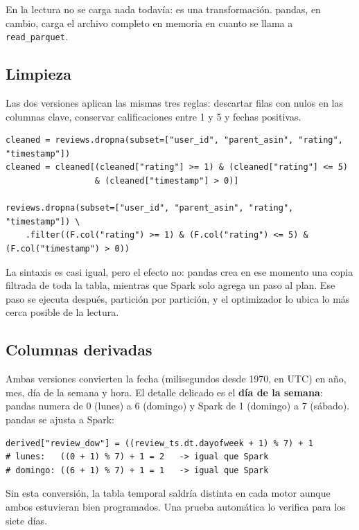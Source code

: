 \documentclass[11pt,a4paper]{article}
\begin{document}
En la lectura no se carga nada todavía: es una transformación. pandas, en cambio, carga el
archivo completo en memoria en cuanto se llama a \texttt{read\_parquet}.

\subsection{Limpieza}

Las dos versiones aplican las mismas tres reglas: descartar filas con nulos en las columnas
clave, conservar calificaciones entre 1 y 5 y fechas positivas.

\begin{lstlisting}[caption={Limpieza en pandas (arriba) y en Spark (abajo).}]
cleaned = reviews.dropna(subset=["user_id", "parent_asin", "rating", "timestamp"])
cleaned = cleaned[(cleaned["rating"] >= 1) & (cleaned["rating"] <= 5)
                  & (cleaned["timestamp"] > 0)]

reviews.dropna(subset=["user_id", "parent_asin", "rating", "timestamp"]) \
    .filter((F.col("rating") >= 1) & (F.col("rating") <= 5) & (F.col("timestamp") > 0))
\end{lstlisting}

La sintaxis es casi igual, pero el efecto no: pandas crea en ese momento una copia filtrada
de toda la tabla, mientras que Spark solo agrega un paso al plan. Ese paso se ejecuta
después, partición por partición, y el optimizador lo ubica lo más cerca posible de la
lectura.

\subsection{Columnas derivadas}

Ambas versiones convierten la fecha (milisegundos desde 1970, en UTC) en año, mes, día de la
semana y hora. El detalle delicado es el \textbf{día de la semana}: pandas numera de 0
(lunes) a 6 (domingo) y Spark de 1 (domingo) a 7 (sábado). pandas se ajusta a Spark:

\begin{lstlisting}[caption={Conversión del día de la semana de pandas a la numeración de Spark.}]
derived["review_dow"] = ((review_ts.dt.dayofweek + 1) % 7) + 1
# lunes:   ((0 + 1) % 7) + 1 = 2   -> igual que Spark
# domingo: ((6 + 1) % 7) + 1 = 1   -> igual que Spark
\end{lstlisting}

Sin esta conversión, la tabla temporal saldría distinta en cada motor aunque ambos
estuvieran bien programados. Una prueba automática lo verifica para los siete días.
\end{document}
